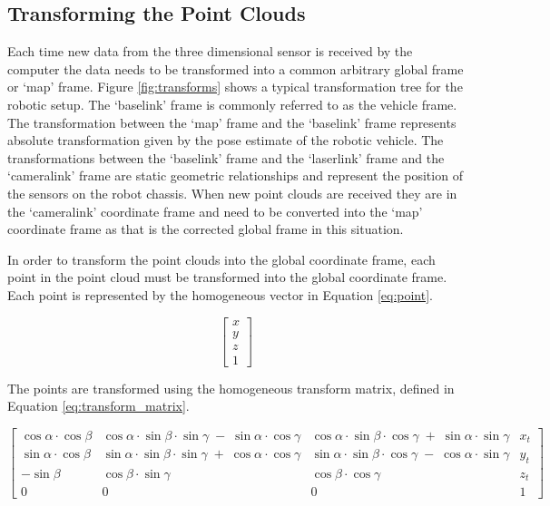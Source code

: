 \documentclass[12pt]{report}
\begin{document}
\subsection{Transforming the Point Clouds}
Each time new data from the three dimensional sensor is received by the computer the data needs to be transformed into a common arbitrary global frame or `map' frame. Figure \ref{fig:transforms} shows a typical transformation tree for the robotic setup. The `base\textunderscore{}link' frame is commonly referred to as the vehicle frame. The transformation between the `map' frame and the `base\textunderscore{}link' frame represents absolute transformation given by the pose estimate of the robotic vehicle. The transformations between the `base\textunderscore{}link' frame and the `laser\textunderscore{}link' frame and the `camera\textunderscore{}link' frame are static geometric relationships and represent the position of the sensors on the robot chassis. When new point clouds are received they are in the `camera\textunderscore{}link' coordinate frame and need to be converted into the `map' coordinate frame as that is the corrected global frame in this situation.

In order to transform the point clouds into the global coordinate frame, each point in the point cloud must be transformed into the global coordinate frame.  Each point is represented by the homogeneous vector in Equation \ref{eq:point}.

\begin{equation} \label{eq:point}
\left[ \begin{array}{c} x \\ y \\ z \\ 1 \end{array} \right]
\end{equation}

The points are transformed using the homogeneous transform matrix\cite{lavalle2006planning}, defined in Equation \ref{eq:transform_matrix}.

\begin{equation} \label{eq:transform_matrix}
\left[ \begin{array}{cccc} \cos \alpha \cdot \cos \beta  & \cos \alpha \cdot \sin \beta \cdot \sin \gamma \; -\; \sin \alpha \cdot \cos \gamma  & \cos \alpha \cdot \sin \beta \cdot \cos \gamma \; +\; \sin \alpha \cdot \sin \gamma  & x_{t} \\ \sin \alpha \cdot \cos \beta  & \sin \alpha \cdot \sin \beta \cdot \sin \gamma \; +\; \cos \alpha \cdot \cos \gamma  & \sin \alpha \cdot \sin \beta \cdot \cos \gamma \; -\; \cos \alpha \cdot \sin \gamma  & y_{t} \\ -\sin \beta  & \cos \beta \cdot \sin \gamma  & \cos \beta \cdot \cos \gamma & z_{t} \\ 0 & 0 & 0 & 1 \end{array} \right]
\end{equation}
\end{document}
